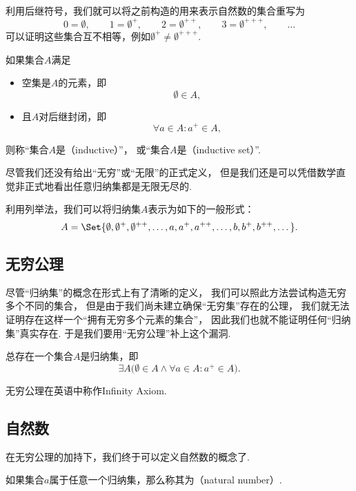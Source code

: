 利用后继符号，我们就可以将之前构造的用来表示自然数的集合重写为\[
	0=\emptyset, \qquad
	1=\emptyset^+, \qquad
	2=\emptyset^{++}, \qquad
	3=\emptyset^{+++}, \qquad
	\dotsc
\]
可以证明这些集合互不相等，例如\(\emptyset^+\neq\emptyset^{+++}\).

\begin{definition}[归纳集]\label{definition:集合论.归纳集的定义}
如果集合\(A\)满足
\begin{itemize}
	\item 空集是\(A\)的元素，即\[
		\emptyset \in A,
	\]
	\item 且\(A\)对后继封闭，即\[
		\forall a \in A : a^+ \in A,
	\]
\end{itemize}
则称“集合\(A\)是（inductive）”，
或“集合\(A\)是（inductive set）”.
\end{definition}
尽管我们还没有给出“无穷”或“无限”的正式定义，
但是我们还是可以凭借数学直觉非正式地看出任意归纳集都是无限无尽的.

利用列举法，我们可以将归纳集\(A\)表示为如下的一般形式：\[
	A = \Set{
		\emptyset, \emptyset^+, \emptyset^{++}, \dotsc,
		a, a^+, a^{++}, \dotsc,
		b, b^+, b^{++}, \dotsc
	}.
\]

\subsection{无穷公理}
尽管“归纳集”的概念在形式上有了清晰的定义，
我们可以照此方法尝试构造无穷多个不同的集合，
但是由于我们尚未建立确保“无穷集”存在的公理，
我们就无法证明存在这样一个“拥有无穷多个元素的集合”，
因此我们也就不能证明任何“归纳集”真实存在.
于是我们要用“无穷公理”补上这个漏洞.
\begin{axiom}[无穷公理]
总存在一个集合\(A\)是归纳集，即\[
	\exists A \bigl(
		\emptyset \in A
		\land
		\forall a \in A : a^+ \in A
	\bigr).
\]
\end{axiom}
无穷公理在英语中称作Infinity Axiom.

\subsection{自然数}
在无穷公理的加持下，我们终于可以定义自然数的概念了.
\begin{definition}\label{definition:集合论.自然数的定义}
如果集合\(a\)属于任意一个归纳集，那么称其为（natural number）.
\end{definition}

